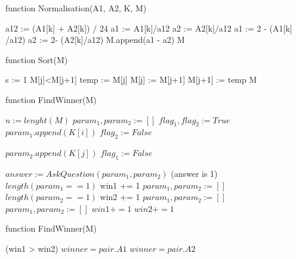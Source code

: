 \documentclass[a4paper, 14pt]{report}
\begin{document}
\begin{algorithm}
	\caption{function Normalisation(A1, A2, K, M)}
	\begin{algorithmic}[1]
			\State a12 := (A1[k] + A2[k]) / 24
				\State	a1 := A1[k]/a12
				\State a2 := A2[k]/a12
			\Else
				\State a1 := 2 - (A1[k] /a12)
				\State a2 := 2- (A2[k]/a12)
			\EndIf
			\State M.append(a1 - a2)
		\EndFor
		\State \Return M
\end{algorithmic}
\end{algorithm}

\begin{algorithm}
	\caption{function Sort(M)}
	\begin{algorithmic}[1]
		\State s := 1
				\If M[j]<M[j+1]
					\State temp := M[j]
					\State M[j] := M[j+1]
					\State M[j+1] := temp
				\EndIf
			\EndFor
		\EndFor
		\State \Return M
	\end{algorithmic}
\end{algorithm}


\begin{algorithm}
	\caption{function FindWinner(M)}
	\begin{algorithmic}[1]
		\State $n:=lenght (M)$
		\State $param_1, param_2 := []$
		\State $flag_1, flag_2 := True$
					\State $param_1.append(K[i])$
					\State $flag_2 := False$
				\EndIf
					
					\State $param_2.append(K[j])$
					\State $flag_1 := False$
				\EndIf
				
					\State $answer := AskQuestion(param_1, param_2)$
					\If (answer is 1)
						\If $length (param_1 == 1)$
							\State win1 += 1
						\Else
							\State $param_1, param_2 := []$
						\EndIf
						\If $length (param_2 == 1)$
							\State win2 += 1
						\Else
						\State $param_1, param_2 := []$
						\EndIf
					\Else
						\State $param_1, param_2 := []$
					\EndIf
					\State $win1 += 1$
					\State $win2 += 1$
					
	\end{algorithmic}
\end{algorithm}

\begin{algorithm}
	\caption{function FindWinner(M)}
	\begin{algorithmic}[1]
		
					
				\Else
					\If (win1 > win2)
						\State $winner = pair.A1$
					\Else \State $winner = pair.A2$
					\EndIf
				\EndIf
			\EndFor
		\EndFor
	\end{algorithmic}
\end{algorithm}
\end{document}
